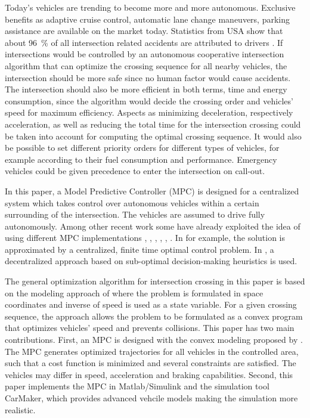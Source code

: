 \documentclass[letterpaper,10pt,conference]{ieeeconf}
\begin{document}
Today's vehicles are trending to become more and more autonomous. Exclusive benefits as adaptive cruise control, automatic lane change maneuvers, parking assistance are available on the market today. Statistics from USA show that about \SI{96}{\%} of all intersection related accidents are attributed to drivers \cite{nhtsa}. If intersections would be controlled by an autonomous cooperative intersection algorithm that can optimize the crossing sequence for all nearby vehicles, the intersection should be more safe since no human factor would cause accidents. The intersection should also be more efficient in both terms, time and energy consumption, since the algorithm would decide the crossing order and vehicles' speed for maximum efficiency. Aspects as minimizing deceleration, respectively acceleration, as well as reducing the total time for the intersection crossing could be taken into account for computing the optimal crossing sequence. It would also be possible to set different priority orders for different types of vehicles, for example according to their fuel consumption and performance. Emergency vehicles could be given precedence to enter the intersection on call-out.

In this paper, a Model Predictive Controller (MPC) is designed for a centralized system which takes control over autonomous vehicles within a certain surrounding of the intersection. The vehicles are assumed to drive fully autonomously. Among other recent work some have already exploited the idea of using different MPC implementations \cite{eleven}, \cite{twelve}, \cite{thirteen}, \cite{fourteen}, \cite{fifteen}, \cite{nikolce}. In \cite{thirteen} for example, the solution is approximated by a centralized, finite time optimal control problem. In \cite{fourteen}, a decentralized approach based on sub-optimal decision-making heuristics is used.

The general optimization algorithm for intersection crossing in this paper is based on the modeling approach of \cite{nikolce} where the problem is formulated in space coordinates and inverse of speed is used as a state variable. For a given crossing sequence, the approach allows the problem to be formulated as a convex program that optimizes vehicles' speed and prevents collisions. This paper has two main contributions. First, an MPC is designed with the convex modeling proposed by \cite{nikolce}. The MPC generates optimized trajectories for all vehicles in the controlled area, such that a cost function is minimized and several constraints are satisfied. The vehicles may differ in speed, acceleration and braking capabilities. Second, this paper implements the MPC in Matlab/Simulink and the simulation tool CarMaker, which provides advanced vehcile models making the simulation more realistic.
\end{document}
